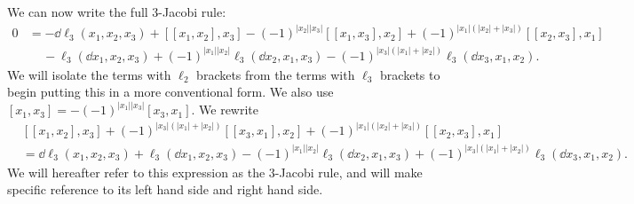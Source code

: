 We can now write the full 3-Jacobi rule:
\begin{align*}
	0&=-\dd \ell _3(x_1,x_2,x_3) + [[x_1,x_2],x_3] - (-1)^{\left| x_2 \right| \left| x_3 \right| } [[x_1,x_3],x_2] + (-1)^{\left| x_1 \right| (\left| x_2 \right| +\left| x_3 \right| )} [[x_2,x_3],x_1]\\
	 &\,\,\,\,\,\,\,-\ell _3(\dd x_1,x_2,x_3) + (-1)^{\left| x_1 \right| \left| x_2 \right| } \ell _3(\dd x_2,x_1,x_3) - (-1)^{\left| x_3 \right| (\left| x_1 \right| +\left| x_2 \right| )} \ell _3(\dd x_3,x_1,x_2)
.\end{align*}
We will isolate the terms with $\ell _2$ brackets from the terms with $\ell _3$ brackets to begin putting this in a more conventional form. We also use $[x_1,x_3] = -(-1)^{\left| x_1 \right| \left| x_3 \right| } [x_3,x_1]$. We rewrite
\begin{align*}
	&[[x_1,x_2],x_3] + (-1)^{\left| x_3 \right|(\left| x_1 \right| +\left| x_2 \right| ) } [[x_3,x_1],x_2] + (-1)^{\left| x_1 \right| (\left| x_2 \right| +\left| x_3 \right| )} [[x_2,x_3],x_1]\\
	&=\dd \ell _3(x_1,x_2,x_3) + \ell _3(\dd x_1,x_2,x_3) - (-1)^{\left| x_1 \right| \left| x_2 \right| } \ell _3(\dd x_2,x_1,x_3) + (-1)^{\left| x_3 \right| (\left| x_1 \right| +\left| x_2 \right| )} \ell _3(\dd x_3,x_1,x_2)
.\end{align*}
We will hereafter refer to this expression as the 3-Jacobi rule, and will make specific reference to its left hand side and right hand side.

